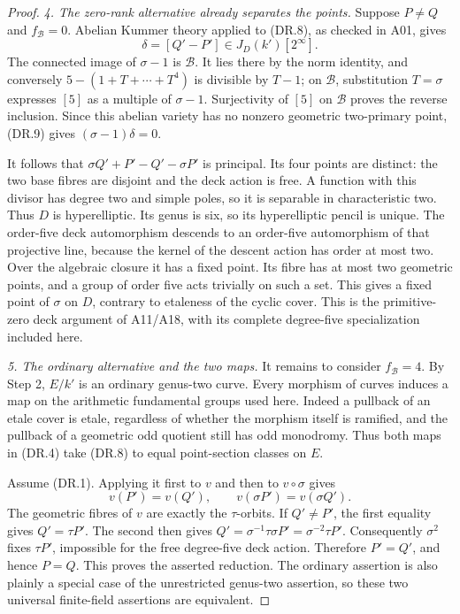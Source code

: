 \begin{proof}
\emph{4. The zero-rank alternative already separates the points.}
Suppose $P\ne Q$ and $f_{\mathcal B}=0$.  Abelian Kummer theory applied
to (DR.8), as checked in A01, gives
\[
                     \delta=[Q'-P']\in J_D(k')[2^\infty].
 \tag{DR.9}
\]
The connected image of $\sigma-1$ is $\mathcal B$.  It lies there by
the norm identity, and conversely $5-(1+T+\cdots+T^4)$ is divisible
by $T-1$; on $\mathcal B$, substitution $T=\sigma$ expresses $[5]$
as a multiple of $\sigma-1$.  Surjectivity of $[5]$ on
$\mathcal B$ proves the reverse inclusion.  Since this abelian variety
has no nonzero geometric two-primary point, (DR.9) gives
$(\sigma-1)\delta=0$.

It follows that $\sigma Q'+P'-Q'-\sigma P'$ is principal.  Its four
points are distinct: the two base fibres are disjoint and the deck
action is free.  A function with this divisor has degree two and
simple poles, so it is separable in characteristic two.  Thus $D$ is
hyperelliptic.  Its genus is six, so its hyperelliptic pencil is unique.
The order-five deck automorphism descends to an order-five
automorphism of that projective line, because the kernel of the
descent action has order at most two.  Over the algebraic closure it
has a fixed point.  Its fibre has at most two geometric points, and a
group of order five acts trivially on such a set.  This gives a fixed
point of $\sigma$ on $D$, contrary to etaleness of the cyclic cover.
This is the primitive-zero deck argument of A11/A18, with its complete
degree-five specialization included here.

\emph{5. The ordinary alternative and the two maps.}
It remains to consider $f_{\mathcal B}=4$.  By Step 2, $E/k'$ is an
ordinary genus-two curve.  Every morphism of curves induces a map on
the arithmetic fundamental groups used here.  Indeed a pullback of
an etale cover is etale, regardless of whether the morphism itself is
ramified, and the pullback of a geometric odd quotient still has odd
monodromy.  Thus both maps in (DR.4) take (DR.8) to equal point-section
classes on $E$.

Assume (DR.1).  Applying it first to $v$ and then to $v\circ\sigma$
gives
\[
                 v(P')=v(Q'),\qquad
                 v(\sigma P')=v(\sigma Q').
 \tag{DR.10}
\]
The geometric fibres of $v$ are exactly the $\tau$-orbits.  If
$Q'\ne P'$, the first equality gives $Q'=\tau P'$.  The second then
gives $Q'=\sigma^{-1}\tau\sigma P'=\sigma^{-2}\tau P'$.
Consequently $\sigma^2$ fixes $\tau P'$, impossible for the free
degree-five deck action.  Therefore $P'=Q'$, and hence $P=Q$.
This proves the asserted reduction.  The ordinary assertion is also
plainly a special case of the unrestricted genus-two assertion, so
these two universal finite-field assertions are equivalent.
\end{proof}

